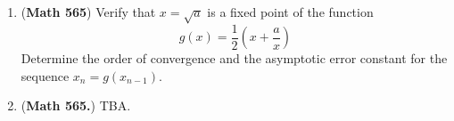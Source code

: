 \documentclass{article}
\begin{document}
\begin{enumerate}
\item ({\bf Math 565}) Verify that $x = \sqrt{a}$ is a fixed point of the function
\begin{equation}
g(x) = \frac{1}{2}\left(x + \frac{a}{x}\right)
\end{equation}
Determine the order of convergence and the asymptotic error constant for the sequence $x_n = g(x_{n-1})$.  

\item ({\bf Math 565.}) TBA.




\end{enumerate}
\end{document}
